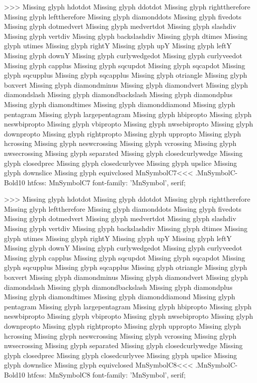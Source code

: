 >>>
Missing glyph	hdotdot
Missing glyph	ddotdot
Missing glyph	righttherefore
Missing glyph	lefttherefore
Missing glyph	diamonddots
Missing glyph	fivedots
Missing glyph	dotmedvert
Missing glyph	medvertdot
Missing glyph	slashdiv
Missing glyph	vertdiv
Missing glyph	backslashdiv
Missing glyph	dtimes
Missing glyph	utimes
Missing glyph	rightY
Missing glyph	upY
Missing glyph	leftY
Missing glyph	downY
Missing glyph	curlywedgedot
Missing glyph	curlyveedot
Missing glyph	capplus
Missing glyph	sqcupdot
Missing glyph	sqcapdot
Missing glyph	sqcupplus
Missing glyph	sqcapplus
Missing glyph	otriangle
Missing glyph	boxvert
Missing glyph	diamondminus
Missing glyph	diamondvert
Missing glyph	diamondslash
Missing glyph	diamondbackslash
Missing glyph	diamondplus
Missing glyph	diamondtimes
Missing glyph	diamonddiamond
Missing glyph	pentagram
Missing glyph	largepentagram
Missing glyph	hbipropto
Missing glyph	neswbipropto
Missing glyph	vbipropto
Missing glyph	nwsebipropto
Missing glyph	downpropto
Missing glyph	rightpropto
Missing glyph	uppropto
Missing glyph	hcrossing
Missing glyph	neswcrossing
Missing glyph	vcrossing
Missing glyph	nwsecrossing
Missing glyph	separated
Missing glyph	closedcurlywedge
Missing glyph	closedprec
Missing glyph	closedcurlyvee
Missing glyph	upslice
Missing glyph	downslice
Missing glyph	equivclosed
\<MnSymbolC7\><<<
.MnSymbolC-Bold10
htfcss:  MnSymbolC7  font-family: 'MnSymbol', serif;

>>>
Missing glyph	hdotdot
Missing glyph	ddotdot
Missing glyph	righttherefore
Missing glyph	lefttherefore
Missing glyph	diamonddots
Missing glyph	fivedots
Missing glyph	dotmedvert
Missing glyph	medvertdot
Missing glyph	slashdiv
Missing glyph	vertdiv
Missing glyph	backslashdiv
Missing glyph	dtimes
Missing glyph	utimes
Missing glyph	rightY
Missing glyph	upY
Missing glyph	leftY
Missing glyph	downY
Missing glyph	curlywedgedot
Missing glyph	curlyveedot
Missing glyph	capplus
Missing glyph	sqcupdot
Missing glyph	sqcapdot
Missing glyph	sqcupplus
Missing glyph	sqcapplus
Missing glyph	otriangle
Missing glyph	boxvert
Missing glyph	diamondminus
Missing glyph	diamondvert
Missing glyph	diamondslash
Missing glyph	diamondbackslash
Missing glyph	diamondplus
Missing glyph	diamondtimes
Missing glyph	diamonddiamond
Missing glyph	pentagram
Missing glyph	largepentagram
Missing glyph	hbipropto
Missing glyph	neswbipropto
Missing glyph	vbipropto
Missing glyph	nwsebipropto
Missing glyph	downpropto
Missing glyph	rightpropto
Missing glyph	uppropto
Missing glyph	hcrossing
Missing glyph	neswcrossing
Missing glyph	vcrossing
Missing glyph	nwsecrossing
Missing glyph	separated
Missing glyph	closedcurlywedge
Missing glyph	closedprec
Missing glyph	closedcurlyvee
Missing glyph	upslice
Missing glyph	downslice
Missing glyph	equivclosed
\<MnSymbolC8\><<<
.MnSymbolC-Bold10
htfcss:  MnSymbolC8  font-family: 'MnSymbol', serif;


